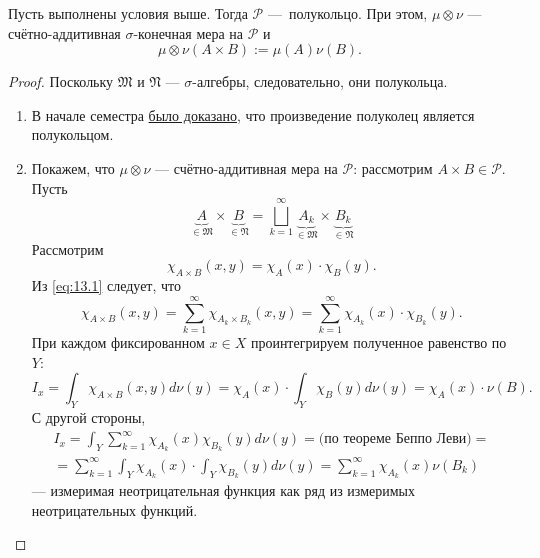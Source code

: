 \begin{theorem}
    Пусть выполнены условия выше. Тогда $\mathcal{P}$ — полукольцо.
    При этом, $\mu \otimes \nu$ — счётно-аддитивная $\sigma$-конечная мера на $\mathcal{P}$ и
    \[\mu \otimes \nu(A \times B) := \mu(A) \nu(B).\]
\end{theorem} 
\begin{proof}
    Поскольку $\mathfrak{M}$ и $\mathfrak{N}$ — $\sigma$-алгебры, следовательно, они полукольца.
    \begin{enumerate}
        \item В начале семестра \hyperref[th:1.1]{было доказано}, что произведение полуколец является полукольцом.
        \item Покажем, что $\mu \otimes \nu$ — счётно-аддитивная мера на $\mathcal{P}$:
        рассмотрим $A \times B \in \mathcal{P}$.
        Пусть 
        \begin{equation}
            \underbrace{A}_{\in \mathfrak{M}} \times \underbrace{B}_{\in \mathfrak{N}} = \bigsqcup\limits_{k=1}^{\infty} \underbrace{A_k}_{\in \mathfrak{M}} \times \underbrace{B_k}_{\in \mathfrak{N}} \label{eq:13.1}
        \end{equation}
        Рассмотрим
        \[\chi_{A \times B} (x,y) = \chi_A(x) \cdot \chi_B(y).\]
        Из \eqref{eq:13.1} следует, что
        \[\chi_{A \times B} (x,y) = \sum\limits_{k=1}^{\infty} \chi_{A_k \times B_k} (x,y) = \sum\limits_{k=1}^{\infty} \chi_{A_k} (x) \cdot \chi_{B_k}(y).\]
        При каждом фиксированном $x \in X$ проинтегрируем полученное равенство по $Y$:
        \[I_x = \int_Y \chi_{A \times B} (x,y) d\nu(y)
        = \chi_A(x) \cdot \int_Y \chi_B(y) d\nu(y)
        = \chi_A(x) \cdot \nu(B).\]
        С другой стороны,
        \begin{multline*}
            I_x = \int_Y \sum\limits_{k=1}^{\infty} \chi_{A_k}(x) \chi_{B_k}(y) d\nu(y)
            = \text{(по теореме Беппо Леви)}
            =\\=
            \sum\limits_{k=1}^{\infty} \int_Y \chi_{A_k}(x) \cdot \int_Y \chi_{B_k}(y) d\nu(y)
            = \sum\limits_{k=1}^{\infty} \chi_{A_k} (x) \nu(B_k)
        \end{multline*} 
        — измеримая неотрицательная функция как ряд из измеримых неотрицательных функций.
        

\end{enumerate}
\end{proof}

